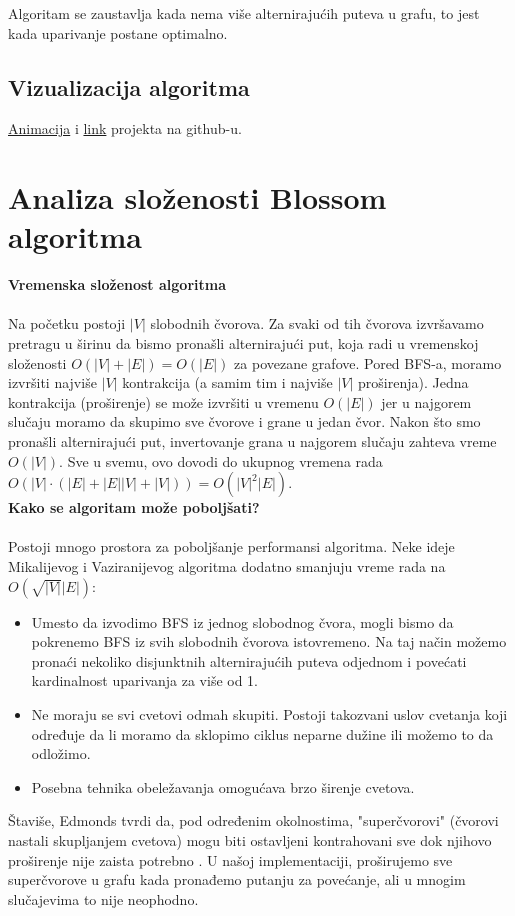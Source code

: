 \documentclass[11pt,a4paper]{article}
\theoremstyle{definition}
\begin{document}
Algoritam se zaustavlja kada nema više alternirajućih puteva u grafu, to jest kada uparivanje postane optimalno.

\subsection{Vizualizacija algoritma}
 \href{https://vimeo.com/927577879?fbclid=IwAR2BZosAPXiijL_bKGFEd95QWWcMh0Tdz8zW5eE52dDTUGJyfFTJhD0R6kc_aem_AcTke2drBvhw1lr_JueAdMddzb8covf0AeiVGffmFjbfZ_R8yk55H-Y6KBoQ98n4ckfnwsH-aqXiaPvwcyzxl3DU}{Animacija} i
 \href{https://github.com/MarijaBB/Blossom-algorithm/}{link}
 projekta na github-u.
\newpage
\section{Analiza složenosti Blossom algoritma}
\vspace{0.5cm}
\noindent\textbf{Vremenska složenost algoritma}\\ \\
Na početku postoji $|V|$ slobodnih čvorova. Za svaki od tih čvorova izvršavamo pretragu u širinu da bismo pronašli alternirajući put, koja radi u vremenskoj složenosti $O(|V|+|E|) = O(|E|)$ za povezane grafove. Pored BFS-a, moramo izvršiti najviše $|V|$ kontrakcija (a samim tim i najviše $|V|$ proširenja). Jedna kontrakcija (proširenje) se može izvršiti u vremenu $O(|E|)$ jer u najgorem slučaju moramo da skupimo sve čvorove i grane u jedan čvor. Nakon što smo pronašli alternirajući put, invertovanje grana u najgorem slučaju zahteva vreme $O(|V|)$. Sve u svemu, ovo dovodi do ukupnog vremena rada $O(|V| \cdot (|E|+|E||V|+|V|))=O(|V|^2|E|)$.
\vspace{0.5cm}\\
\textbf{Kako se algoritam može poboljšati?} \\ \\
Postoji mnogo prostora za poboljšanje performansi algoritma. Neke ideje Mikalijevog i Vaziranijevog algoritma dodatno smanjuju vreme rada na $O(\sqrt{|V|}|E|)$:
\begin{itemize}
\item Umesto da izvodimo BFS iz jednog slobodnog čvora, mogli bismo da pokrenemo BFS iz svih slobodnih čvorova istovremeno. Na taj način možemo pronaći nekoliko disjunktnih alternirajućih puteva odjednom i povećati kardinalnost uparivanja za više od 1.
\item Ne moraju se svi cvetovi odmah skupiti. Postoji takozvani uslov cvetanja koji određuje da li moramo da sklopimo ciklus neparne dužine ili možemo to da odložimo.
\item Posebna tehnika obeležavanja omogućava brzo širenje cvetova.
\end{itemize}
Štaviše, Edmonds tvrdi da, pod određenim okolnostima, "superčvorovi" (čvorovi nastali skupljanjem cvetova) mogu biti ostavljeni kontrahovani sve dok njihovo proširenje nije zaista potrebno \cite{knjiga2}. U našoj implementaciji, proširujemo sve superčvorove u grafu kada pronađemo putanju za povećanje, ali u mnogim slučajevima to nije neophodno.
\end{document}
